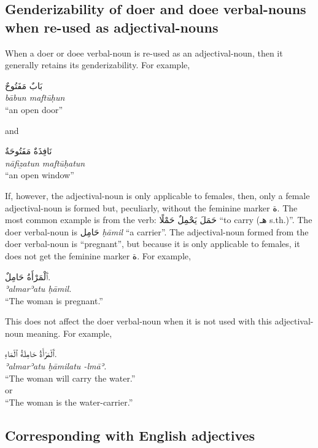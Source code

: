 \documentclass[
  10pt,
]{book}
\begin{document}
\subsection{Genderizability of doer and doee verbal-nouns when re-used as adjectival-nouns}\label{genderizability-of-doer-and-doee-verbal-nouns-when-re-used-as-adjectival-nouns}

When a doer or doee verbal-noun is re-used as an adjectival-noun, then it generally retains its genderizability. For example,

\foreignlanguage{arabic}{بَابٌ مَفَتُوحٌ}\\
\emph{bābun maftūḥun}\\
\enquote{an open door}

and

\foreignlanguage{arabic}{نَافِذَةٌ مَفَتُوحَةٌ}\\
\emph{nāfiẕatun maftūḥatun}\\
\enquote{an open window}

If, however, the adjectival-noun is only applicable to females, then, only a female adjectival-noun is formed but, peculiarly, without the feminine marker \foreignlanguage{arabic}{ة}. The most common example is from the verb:
\foreignlanguage{arabic}{حَمَلَ يَحْمِلٌ حَمْلًا} \enquote{to carry (\foreignlanguage{arabic}{هـ} s.th.)}. The doer verbal-noun is \foreignlanguage{arabic}{حَامِل} \emph{ḥāmil} \enquote{a carrier}. The adjectival-noun formed from the doer verbal-noun is \enquote{pregnant}, but because it is only applicable to females, it does not get the feminine marker \foreignlanguage{arabic}{ة}. For example,

\foreignlanguage{arabic}{ٱَلْمَرْأَةُ حَامِلٌ.}\\
\emph{ʾalmarʾatu ḥāmil.}\\
\enquote{The woman is pregnant.}

This does not affect the doer verbal-noun when it is not used with this adjectival-noun meaning. For example,

\foreignlanguage{arabic}{ٱَلْمَرْأَةُ حَامِلَةُ ٱلْمَاءِ.}\\
\emph{ʾalmarʾatu ḥāmilatu -lmāʾ.}\\
\enquote{The woman will carry the water.}\\
or\\
\enquote{The woman is the water-carrier.}

\subsection{Corresponding with English adjectives}\label{corresponding-with-english-adjectives}
\end{document}
